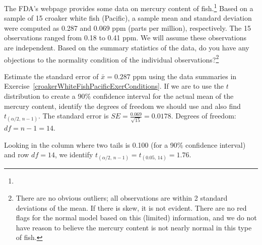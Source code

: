 
\begin{exercise} \label{croakerWhiteFishPacificExerConditions}
The FDA's webpage provides some data on mercury content of fish.\footnote{} Based on a sample of 15 croaker white fish (Pacific), a sample mean and standard deviation were computed as 0.287 and 0.069 ppm (parts per million), respectively. The 15 observations ranged from 0.18 to 0.41 ppm. We will assume these observations are independent. Based on the summary statistics of the data, do you have any objections to the normality condition of the individual observations?\footnote{There are no obvious outliers; all observations are within 2 standard deviations of the mean. If there is skew, it is not evident. There are no red flags for the normal model based on this (limited) information, and we do not have reason to believe the mercury content is not nearly normal in this type of fish.}
\end{exercise}

\begin{example}{Estimate the standard error of $\bar{x}=0.287$ ppm using the data summaries in Exercise~\ref{croakerWhiteFishPacificExerConditions}. If we are to use the $t$ distribution to create a 90\% confidence interval for the actual mean of the mercury content, identify the degrees of freedom we should use and also find $t_{(\alpha/2, \, n-1)}$.}
\label{croakerWhiteFishPacificExerSEDFTStar}
The standard error is $SE = \frac{0.069}{\sqrt{15}} = 0.0178$. Degrees of freedom: $df = n - 1 = 14$.

Looking in the column where two tails is 0.100 (for a 90\% confidence interval) and row $df=14$, we identify $t_{(\alpha/2, \, n-1)} = t_{(0.05, \,14)} = 1.76$.
\end{example}

